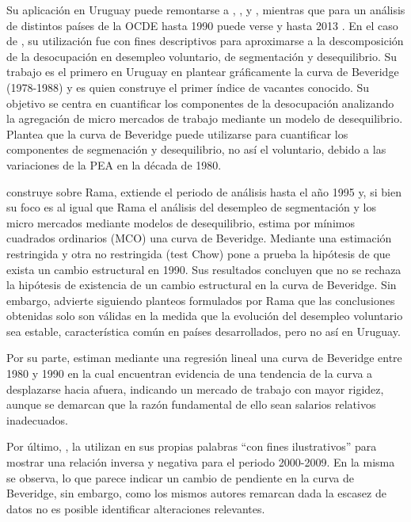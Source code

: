 \documentclass[msc,oneside,a4paper]{udelar} %
\begin{document}
  Su aplicación en Uruguay puede remontarse a \cite{Rama1988}, \cite{DECON1993}, \cite{Urrestarazu1997} y \cite{Alma2011}, mientras que para un análisis de distintos países de la OCDE hasta 1990 puede verse \cite{Nickell2002} y hasta 2013 \cite{Hobijn2013}. En el caso de \cite{Rama1988}, su utilización fue con fines descriptivos para aproximarse a la descomposición de la desocupación en desempleo voluntario, de segmentación y desequilibrio. Su trabajo es el primero en Uruguay en plantear gráficamente la curva de Beveridge (1978-1988) y es quien construye el primer índice de vacantes conocido. Su objetivo se centra en cuantificar los componentes de la desocupación analizando la agregación de micro mercados de trabajo mediante un modelo de desequilibrio. Plantea que la curva de Beveridge puede utilizarse para cuantificar los componentes de segmenación y desequilibrio, no así el voluntario, debido a las variaciones de la PEA en la década de 1980.
  
  \cite{Urrestarazu1997} construye sobre Rama, extiende el periodo de análisis hasta el año 1995 y, si bien su foco es al igual que Rama el análisis del desempleo de segmentación y los micro mercados mediante modelos de desequilibrio, estima por mínimos cuadrados ordinarios (MCO) una curva de Beveridge. Mediante una estimación restringida y otra no restringida (test Chow) pone a prueba la hipótesis de que exista un cambio estructural en 1990. Sus resultados concluyen que no se rechaza la hipótesis de existencia de un cambio estructural en la curva de Beveridge. Sin embargo, advierte siguiendo planteos formulados por Rama que las conclusiones obtenidas solo son válidas en la medida que la evolución del desempleo voluntario sea estable, característica común en países desarrollados, pero no así en Uruguay.
  
  Por su parte, \cite{DECON1993} estiman mediante una regresión lineal una curva de Beveridge entre 1980 y 1990 en la cual encuentran evidencia de una tendencia de la curva a desplazarse hacia afuera, indicando un mercado de trabajo con mayor rigidez, aunque se demarcan que la razón fundamental de ello sean salarios relativos inadecuados.
  
  Por último, \cite{Alma2011}, la utilizan en sus propias palabras ``con fines ilustrativos'' para mostrar una relación inversa y negativa para el periodo 2000-2009. En la misma se observa, lo que parece indicar un cambio de pendiente en la curva de Beveridge, sin embargo, como los mismos autores remarcan dada la escasez de datos no es posible identificar alteraciones relevantes.
  
\end{document}
